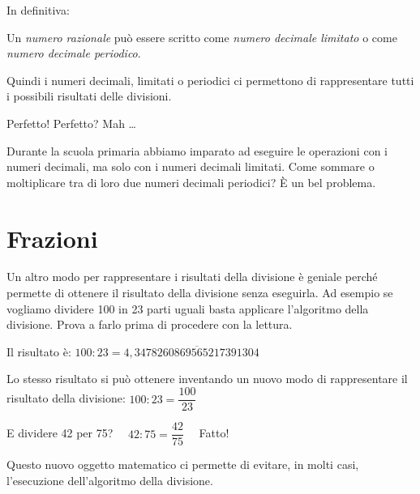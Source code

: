 In definitiva:

\begin{definizione}{}{}
 Un \emph{numero razionale} può essere scritto come \emph{numero decimale 
limitato} o come \emph{numero decimale 
periodico}.
\end{definizione}

Quindi i numeri decimali, limitati o periodici ci permettono di 
rappresentare tutti i possibili risultati delle divisioni.

Perfetto! \quad Perfetto? Mah \dots

Durante la scuola primaria abbiamo imparato ad eseguire le operazioni con i 
numeri decimali, ma solo con i numeri decimali limitati. Come 
sommare o moltiplicare tra di loro due numeri decimali periodici? È un bel 
problema.


\section{Frazioni}
\label{sec:razionali_frazioni}

Un altro modo per rappresentare i risultati della divisione è geniale 
perché permette di ottenere il risultato della divisione senza eseguirla. 
Ad esempio se vogliamo dividere 100 in 23 parti uguali basta applicare 
l'algoritmo della divisione. Prova a farlo prima di procedere con la 
lettura.

Il risultato è:
\(100 : 23 = 4,\overline{3478260869565217391304}\)

Lo stesso risultato si può ottenere inventando un nuovo modo di 
rappresentare il risultato della divisione:
\(100 : 23 = \dfrac{100}{23}\)

E dividere 42 per 75?
\(\quad 42 : 75 = \dfrac{42}{75} \quad\)
Fatto!

Questo nuovo oggetto matematico ci permette di evitare, in molti casi, 
l'esecuzione dell'algoritmo della divisione.

